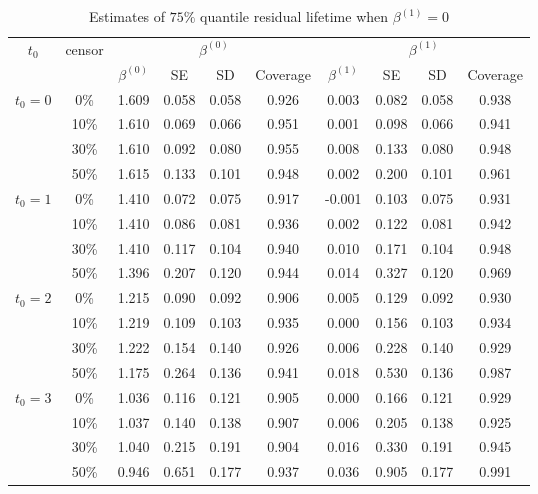 \documentclass[12pt]{article}
\begin{document}
	\begin{table}[H]
		\caption{Estimates of $75\%$ quantile residual lifetime when $\beta^{(1)}=0$}
		\centering
		\begin{tabular}{|c|c|c|c|c|c|c|c|c|c|}
			\hline
			\multirow{2}{*}{$t_0$} & \multirow{2}{*}{censor} & \multicolumn{4}{c|}{$\beta^{(0)}$} & \multicolumn{4}{c|}{$\beta^{(1)}$}\\ \cline{3-10}
			& & $\beta^{(0)}$ & SE & SD  & Coverage  & $\beta^{(1)}$ & SE & SD & Coverage\\
			\hline\hline
			\multirow{4}{*}{$t_0=0$} & 0\% & 1.609 & 0.058 & 0.058 & 0.926 & 0.003 & 0.082 & 0.058 & 0.938 \\
			& 10\% & 1.610 & 0.069 & 0.066 & 0.951 & 0.001 & 0.098 & 0.066 & 0.941 \\
			& 30\% & 1.610 & 0.092 & 0.080 & 0.955 & 0.008 & 0.133 & 0.080 & 0.948 \\
			& 50\% & 1.615 & 0.133 & 0.101 & 0.948 & 0.002 & 0.200 & 0.101 & 0.961 \\
			\hline
			\multirow{4}{*}{$t_0=1$} & 0\% & 1.410 & 0.072 & 0.075 & 0.917 & -0.001 & 0.103 & 0.075 & 0.931 \\
			& 10\% & 1.410 & 0.086 & 0.081 & 0.936 & 0.002 & 0.122 & 0.081 & 0.942 \\
			& 30\% & 1.410 & 0.117 & 0.104 & 0.940 & 0.010 & 0.171 & 0.104 & 0.948 \\
			& 50\% & 1.396 & 0.207 & 0.120 & 0.944 & 0.014 & 0.327 & 0.120 & 0.969 \\
			\hline
			\multirow{4}{*}{$t_0=2$} & 0\% & 1.215 & 0.090 & 0.092 & 0.906 & 0.005 & 0.129 & 0.092 & 0.930 \\
			& 10\% & 1.219 & 0.109 & 0.103 & 0.935 & 0.000 & 0.156 & 0.103 & 0.934 \\
			& 30\% & 1.222 & 0.154 & 0.140 & 0.926 & 0.006 & 0.228 & 0.140 & 0.929 \\
			& 50\% & 1.175 & 0.264 & 0.136 & 0.941 & 0.018 & 0.530 & 0.136 & 0.987 \\
			\hline
			\multirow{4}{*}{$t_0=3$} & 0\% & 1.036 & 0.116 & 0.121 & 0.905 & 0.000 & 0.166 & 0.121 & 0.929 \\
			& 10\% & 1.037 & 0.140 & 0.138 & 0.907 & 0.006 & 0.205 & 0.138 & 0.925 \\
			& 30\% & 1.040 & 0.215 & 0.191 & 0.904 & 0.016 & 0.330 & 0.191 & 0.945 \\
			& 50\% & 0.946 & 0.651 & 0.177 & 0.937 & 0.036 & 0.905 & 0.177 & 0.991 \\	
			\hline
		\end{tabular}
	\end{table}
\end{document}
